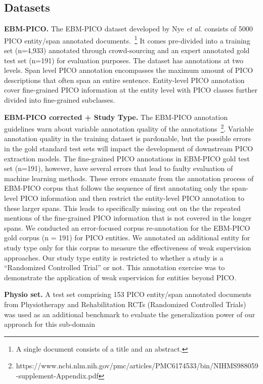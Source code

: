 \documentclass[10.7pt,]{article}
\begin{document}
\subsection{Datasets}\label{data}
%
\textbf{EBM-PICO.}
The EBM-PICO dataset developed by Nye \textit{et al.} consists of 5000 PICO entity/span annotated documents.~\footnote{A single document consists of a title and an abstract.}
It comes pre-divided into a training set (n=4,933) annotated through crowd-sourcing and an expert annotated gold test set (n=191) for evaluation purposes.
The dataset has annotations at two levels.
Span level PICO annotation encompasses the maximum amount of PICO descriptions that often span an entire sentence.
Entity-level PICO annotation cover fine-grained PICO information at the entity level with PICO classes further divided into fine-grained subclasses.



\textbf{EBM-PICO corrected + Study Type.}
The EBM-PICO annotation guidelines warn about variable annotation quality of the annotations~\footnote{https://www.ncbi.nlm.nih.gov/pmc/articles/PMC6174533/bin/NIHMS988059-supplement-Appendix.pdf}.
Variable annotation quality in the training dataset is pardonable, but the possible errors in the gold standard test sets will impact the development of downstream PICO extraction models.
The fine-grained PICO annotations in EBM-PICO gold test set (n=191), however, have several errors that lead to faulty evaluation of machine learning methods.
These errors emanate from the annotation process of EBM-PICO corpus that follows the sequence of first annotating only the span-level PICO information and then restrict the entity-level PICO annotation to these larger spans.
This leads to specifically missing out on the the repeated mentions of the fine-grained PICO information that is not covered in the longer spans. 
We conducted an error-focused corpus re-annotation for the EBM-PICO gold corpus (n = 191) for PICO entities.
We annotated an additional entity for study type only for this corpus to measure the effectiveness of weak supervision approaches.
Our study type entity is restricted to whether a study is a ``Randomized Controlled Trial'' or not.
This annotation exercise was to demonstrate the application of weak supervision for entities beyond PICO.

\textbf{Physio set.} A test set comprising 153 PICO entity/span annotated documents from Physiotherapy and Rehabilitation RCTs (Randomized Controlled Trials) was used as an additional benchmark to evaluate the generalization power of our approach for this sub-domain
\end{document}
